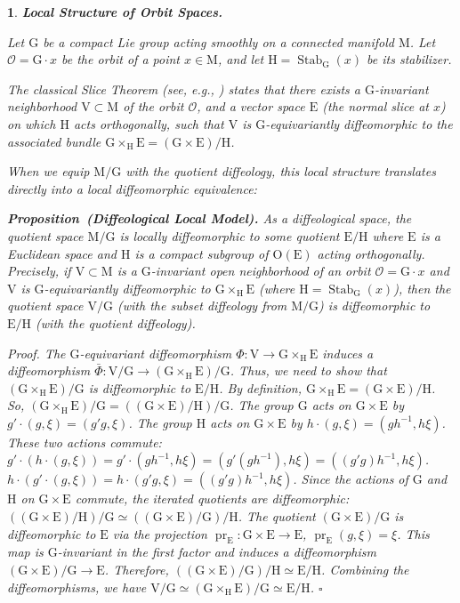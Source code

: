 \documentclass[10pt,reqno,letterpaper,twoside]{amsart}
\theoremstyle{article}
\newtheorem{article}{}
\def\artlabel[#1]{\textbf{#1.}}
\newenvironment{proposition}[1]%
{\noindent\textbf{Proposition#1.} \it}%
{}
\renewenvironment{proof}%
{\noindent\textit{Proof.}}%
{\nolinebreak\hfill $\square$}
\newcommand{\cO}{{\mathcal O}}
\def \E{\mathrm E}
\def \G{\mathrm G}
\def \H{\mathrm H}
\def \M{\mathrm M}
\def \O{\mathrm O}
\def \V{\mathrm V}
\DeclareMathOperator{\pr}{pr}
\DeclareMathOperator{\Stab}{Stab}
\def \H{\mathrm H} %
\def \O{\mathrm O}
\begin{document}
  \begin{article}
    \artlabel[Local Structure of Orbit Spaces]
    \label{Local_Structure_of_Orbit_Spaces}
    
    Let $\G$ be a compact Lie group acting smoothly on a connected manifold $\M$.
    Let $\cO = \G \cdot x$ be the orbit of a point $x \in \M$,
    and let $\H = \Stab_\G(x)$ be its stabilizer.
    
    The classical Slice Theorem (see, e.g., \cite{Pal60, Bre72}) states that there exists a $\G$-invariant neighborhood $\V\subset \M$ of the orbit $\cO$,
    and a vector space $\E$ (the normal slice at $x$) on which $\H$ acts orthogonally,
    such that $\V$ is $\G$-equivariantly diffeomorphic to the associated bundle $\G \times_\H \E = (\G \times \E)/\H$.
    
    When we equip $\M/\G$ with the quotient diffeology,
    this local structure translates directly into a local diffeomorphic equivalence:
    
    \begin{proposition}{~(Diffeological Local Model)}
      \label{loc}
      As a diffeological space,
      the quotient space $\M/\G$ is locally diffeomorphic to some quotient $\E/\H$ where $\E$ is a Euclidean space and $\H$ is a compact subgroup of $\O(\E)$ acting orthogonally.
      Precisely,
      if $\V \subset \M$ is a $\G$-invariant open neighborhood of an orbit $\cO = \G \cdot x$ and $\V$ is $\G$-equivariantly diffeomorphic to $\G \times_\H \E$ (where $\H = \Stab_\G(x)$),
      then the quotient space $\V/\G$ (with the subset diffeology from $\M/\G$) is diffeomorphic to $\E/\H$ (with the quotient diffeology).
    \end{proposition}
    
    \begin{proof}
      The $\G$-equivariant diffeomorphism $\Phi: \V \to \G \times_\H \E$ induces a diffeomorphism $\bar{\Phi}: \V/\G \to (\G \times_\H \E)/\G$.
      Thus,
      we need to show that $(\G \times_\H \E)/\G$ is diffeomorphic to $\E/\H$.
      By definition,
      $\G \times_\H \E = (\G \times \E)/\H$.
      So,
      $(\G \times_\H \E)/\G = ((\G \times \E)/\H)/\G$.
      The group $\G$ acts on $\G \times \E$ by $g' \cdot (g, \xi) = (g'g, \xi)$.
      The group $\H$ acts on $\G \times \E$ by $h \cdot (g, \xi) = (gh^{-1}, h\xi)$.
      These two actions commute:
      $g' \cdot (h \cdot (g, \xi)) = g' \cdot (gh^{-1}, h\xi) = (g'(gh^{-1}), h\xi) = ((g'g)h^{-1}, h\xi)$.
      $h \cdot (g' \cdot (g, \xi)) = h \cdot (g'g, \xi) = ((g'g)h^{-1}, h\xi)$.
      Since the actions of $\G$ and $\H$ on $\G \times \E$ commute,
      the iterated quotients are diffeomorphic: $((\G \times \E)/\H)/\G \simeq ((\G \times \E)/\G)/\H$.
      The quotient $(\G \times \E)/\G$ is diffeomorphic to $\E$ via the projection $\pr_\E: \G \times \E \to \E$, $\pr_\E(g, \xi) = \xi$.
      This map is $\G$-invariant in the first factor and induces a diffeomorphism $(\G \times \E)/\G \to \E$.
      Therefore,
      $((\G \times \E)/\G)/\H \simeq \E/\H$.
      Combining the diffeomorphisms, we have $\V/\G \simeq (\G \times_\H \E)/\G \simeq \E/\H$.
    \end{proof}
    
  \end{article}
  
\end{document}
